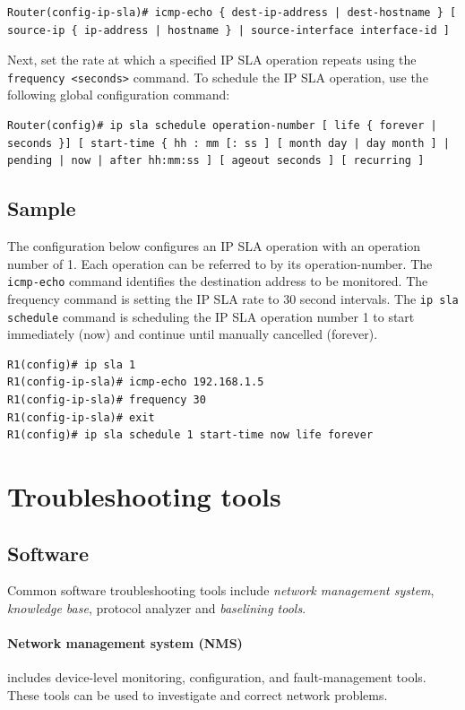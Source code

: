 \begin{verbatim}
Router(config-ip-sla)# icmp-echo { dest-ip-address | dest-hostname } [ source-ip { ip-address | hostname } | source-interface interface-id ] 
\end{verbatim}

Next, set the rate at which a specified IP SLA operation repeats using the \verb|frequency <seconds>| command. To schedule the IP SLA operation, use the following global configuration command:

\begin{verbatim}
Router(config)# ip sla schedule operation-number [ life { forever | seconds }] [ start-time { hh : mm [: ss ] [ month day | day month ] | pending | now | after hh:mm:ss ] [ ageout seconds ] [ recurring ] 
\end{verbatim}

\subsection{Sample}

The configuration below configures an IP SLA operation with an operation number of 1.  Each operation can be referred to by its operation-number. The \verb|icmp-echo| command identifies the destination address to be monitored. The frequency command is setting the IP SLA rate to 30 second intervals. The \verb|ip sla schedule| command is scheduling the IP SLA operation number 1 to start immediately (now) and continue until manually cancelled (forever).

\begin{verbatim}
R1(config)# ip sla 1
R1(config-ip-sla)# icmp-echo 192.168.1.5
R1(config-ip-sla)# frequency 30
R1(config-ip-sla)# exit
R1(config)# ip sla schedule 1 start-time now life forever
\end{verbatim}

\section{Troubleshooting tools}

\subsection{Software}

Common software troubleshooting tools include \emph{network management system}, \emph{knowledge base}, protocol analyzer and \emph{baselining tools}.

\paragraph{Network management system (NMS)}includes device-level monitoring, configuration, and fault-management tools.  These tools can be used to investigate and correct network problems.


